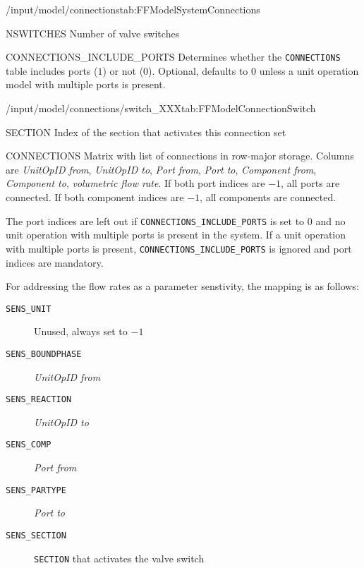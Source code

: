 \begin{groupscope}{/input/model/connections}{tab:FFModelSystemConnections}
  \begin{dataset}[type=int,range={$\geq 1$},length=1]{NSWITCHES}
    Number of valve switches
  \end{dataset}
  \begin{dataset}[type=int,range={$\{ 0,1 \}$},length=1]{CONNECTIONS\_INCLUDE\_PORTS}
    Determines whether the \texttt{CONNECTIONS} table includes ports ($1$) or not ($0$).
    Optional, defaults to $0$ unless a unit operation model with multiple ports is present.
  \end{dataset}
\end{groupscope}

\begin{groupscope}{/input/model/connections/switch\_XXX}{tab:FFModelConnectionSwitch}
  \begin{dataset}[type=int,range={$\geq 0$},length=1]{SECTION}
    Index of the section that activates this connection set
  \end{dataset}
  \begin{dataset}[type=double,range={$\geq -1$},length={$5 \cdot \texttt{NCONNECTIONS}$ / $7 \cdot \texttt{NCONNECTIONS}$}]{CONNECTIONS}
    Matrix with list of connections in row-major storage.
    Columns are \emph{UnitOpID from}, \emph{UnitOpID to}, \emph{Port from}, \emph{Port to}, \emph{Component from}, \emph{Component to}, \emph{volumetric flow rate}.
    If both port indices are $-1$, all ports are connected.
    If both component indices are $-1$, all components are connected.

    The port indices are left out if \texttt{CONNECTIONS\_INCLUDE\_PORTS} is set to $0$ and no unit operation with multiple ports is present in the system.
    If a unit operation with multiple ports is present, \texttt{CONNECTIONS\_INCLUDE\_PORTS} is ignored and port indices are mandatory.

    For addressing the flow rates as a parameter senstivity, the mapping is as follows:
    \begin{description}
      \item[\texttt{SENS\_UNIT}] Unused, always set to $-1$
      \item[\texttt{SENS\_BOUNDPHASE}] \emph{UnitOpID from}
      \item[\texttt{SENS\_REACTION}] \emph{UnitOpID to}
      \item[\texttt{SENS\_COMP}] \emph{Port from}
      \item[\texttt{SENS\_PARTYPE}] \emph{Port to}
      \item[\texttt{SENS\_SECTION}] \texttt{SECTION} that activates the valve switch
    \end{description}\vspace{-\baselineskip}
  \end{dataset}
\end{groupscope}

